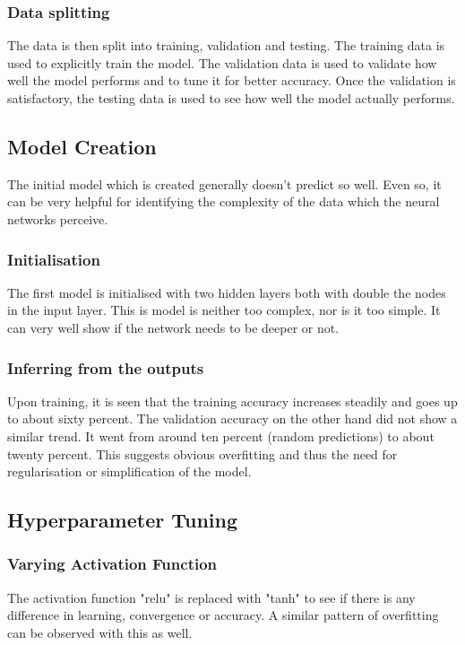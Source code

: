 \documentclass[conference,compsoc]{IEEEtran}
\begin{document}
\subsubsection{Data splitting}
The data is then split into training, validation and testing. The training data is used to explicitly train the model. The validation data is used to validate how well the model performs and to tune it for better accuracy. Once the validation is satisfactory, the testing data is used to see how well the model actually performs.

\subsection{Model Creation}
The initial model which is created generally doesn't predict so well. Even so, it can be very helpful for identifying the complexity of the data which the neural networks perceive.

\subsubsection{Initialisation}
The first model is initialised with two hidden layers both with double the nodes in the input layer. This is model is neither too complex, nor is it too simple. It can very well show if the network needs to be deeper or not.

\subsubsection{Inferring from the outputs}
Upon training, it is seen that the training accuracy increases steadily and goes up to about sixty percent. The validation accuracy on the other hand did not show a similar trend. It went from around ten percent (random predictions) to about twenty percent. This suggests obvious overfitting and thus the need for regularisation or simplification of the model.

\subsection{Hyperparameter Tuning}
\subsubsection{Varying Activation Function}
The activation function "relu" is replaced with "tanh" to see if there is any difference in learning, convergence or accuracy. A similar pattern of overfitting can be observed with this as well.
\end{document}
